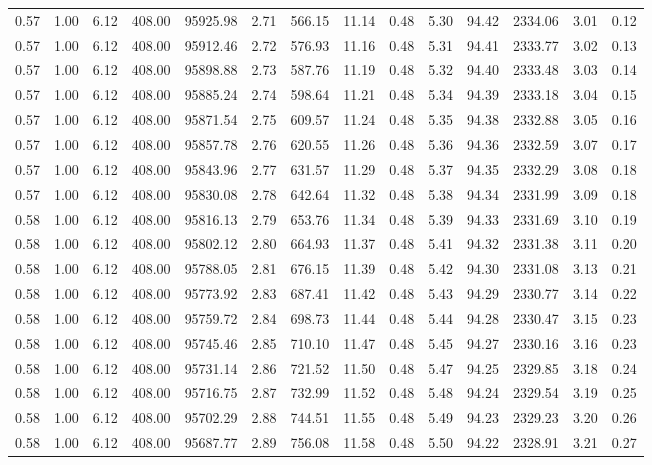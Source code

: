 \begin{table}[!ht]
\begin{tabular}{rrrrrrrrrrrrrr}
0.57 & 1.00 & 6.12 & 408.00 & 95925.98 & 2.71 & 566.15 & 11.14 & 0.48 & 5.30 & 94.42 & 2334.06 & 3.01 & 0.12 \\
0.57 & 1.00 & 6.12 & 408.00 & 95912.46 & 2.72 & 576.93 & 11.16 & 0.48 & 5.31 & 94.41 & 2333.77 & 3.02 & 0.13 \\
0.57 & 1.00 & 6.12 & 408.00 & 95898.88 & 2.73 & 587.76 & 11.19 & 0.48 & 5.32 & 94.40 & 2333.48 & 3.03 & 0.14 \\
0.57 & 1.00 & 6.12 & 408.00 & 95885.24 & 2.74 & 598.64 & 11.21 & 0.48 & 5.34 & 94.39 & 2333.18 & 3.04 & 0.15 \\
0.57 & 1.00 & 6.12 & 408.00 & 95871.54 & 2.75 & 609.57 & 11.24 & 0.48 & 5.35 & 94.38 & 2332.88 & 3.05 & 0.16 \\
0.57 & 1.00 & 6.12 & 408.00 & 95857.78 & 2.76 & 620.55 & 11.26 & 0.48 & 5.36 & 94.36 & 2332.59 & 3.07 & 0.17 \\
0.57 & 1.00 & 6.12 & 408.00 & 95843.96 & 2.77 & 631.57 & 11.29 & 0.48 & 5.37 & 94.35 & 2332.29 & 3.08 & 0.18 \\
0.57 & 1.00 & 6.12 & 408.00 & 95830.08 & 2.78 & 642.64 & 11.32 & 0.48 & 5.38 & 94.34 & 2331.99 & 3.09 & 0.18 \\
0.58 & 1.00 & 6.12 & 408.00 & 95816.13 & 2.79 & 653.76 & 11.34 & 0.48 & 5.39 & 94.33 & 2331.69 & 3.10 & 0.19 \\
0.58 & 1.00 & 6.12 & 408.00 & 95802.12 & 2.80 & 664.93 & 11.37 & 0.48 & 5.41 & 94.32 & 2331.38 & 3.11 & 0.20 \\
0.58 & 1.00 & 6.12 & 408.00 & 95788.05 & 2.81 & 676.15 & 11.39 & 0.48 & 5.42 & 94.30 & 2331.08 & 3.13 & 0.21 \\
0.58 & 1.00 & 6.12 & 408.00 & 95773.92 & 2.83 & 687.41 & 11.42 & 0.48 & 5.43 & 94.29 & 2330.77 & 3.14 & 0.22 \\
0.58 & 1.00 & 6.12 & 408.00 & 95759.72 & 2.84 & 698.73 & 11.44 & 0.48 & 5.44 & 94.28 & 2330.47 & 3.15 & 0.23 \\
0.58 & 1.00 & 6.12 & 408.00 & 95745.46 & 2.85 & 710.10 & 11.47 & 0.48 & 5.45 & 94.27 & 2330.16 & 3.16 & 0.23 \\
0.58 & 1.00 & 6.12 & 408.00 & 95731.14 & 2.86 & 721.52 & 11.50 & 0.48 & 5.47 & 94.25 & 2329.85 & 3.18 & 0.24 \\
0.58 & 1.00 & 6.12 & 408.00 & 95716.75 & 2.87 & 732.99 & 11.52 & 0.48 & 5.48 & 94.24 & 2329.54 & 3.19 & 0.25 \\
0.58 & 1.00 & 6.12 & 408.00 & 95702.29 & 2.88 & 744.51 & 11.55 & 0.48 & 5.49 & 94.23 & 2329.23 & 3.20 & 0.26 \\
0.58 & 1.00 & 6.12 & 408.00 & 95687.77 & 2.89 & 756.08 & 11.58 & 0.48 & 5.50 & 94.22 & 2328.91 & 3.21 & 0.27 \\

\end{tabular}
\end{table}
